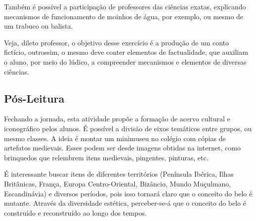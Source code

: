 \documentclass[12pt]{extarticle}
\begin{document}
Também é possível a participação de professores das ciências exatas,
explicando mecanismos de funcionamento de moinhos de água, por exemplo,
ou mesmo de um trabuco ou balista.

Veja, dileto professor, o objetivo desse exercício é a produção de um
conto fictício, outrossim, o mesmo deve conter elementos de
factualidade, que auxiliam o aluno, por meio do lúdico, a compreender
mecanismos e elementos de diversas ciências.

\subsection{Pós-Leitura}

Fechando a jornada, esta atividade propõe a formação de
acervo cultural e iconográfico pelos alunos. É possível a divisão de
eixos temáticos entre grupos, ou mesmo classes. A ideia é montar um
minimuseu no colégio com cópias de artefatos medievais. Esses podem ser
desde imagens obtidas na internet, como brinquedos que relembrem itens
medievais, pingentes, pinturas, etc.

É interessante buscar itens de diferentes territórios (Península
Ibérica, Ilhas Britânicas, França, Europa Centro-Oriental, Bizâncio,
Mundo Muçulmano, Escandinávia) e diversos períodos, pois isso tornará
claro que o conceito do belo é mutante. Através da diversidade estética,
perceber-se-á que o conceito do belo é construído e reconstruído ao
longo dos tempos.
\end{document}
